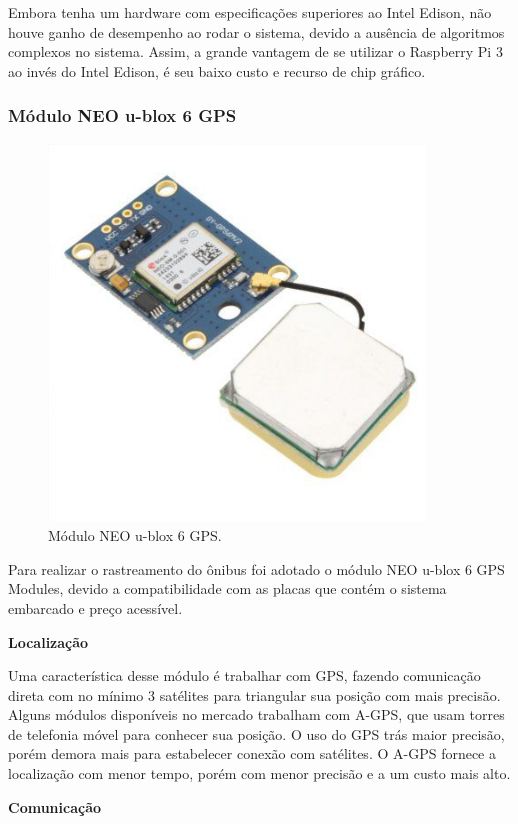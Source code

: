 \documentclass[
	12pt,				%
	oneside,			%
	a4paper,			%
	brazil				%
]{abntex2}
\begin{document}
Embora tenha um hardware com especificações superiores ao Intel Edison, não houve ganho de desempenho ao rodar o sistema, devido a ausência de algoritmos complexos no sistema. Assim, a grande vantagem de se utilizar o Raspberry Pi 3 ao invés do Intel Edison, é seu baixo custo e recurso de chip gráfico.

\subsubsection{Módulo NEO u-blox 6 GPS}

\begin{figure}[!h]
\centering
\includegraphics[width=10cm, center]{images/neo-6m}
\caption{Módulo NEO u-blox 6 GPS.}
\label{Rotulo}
\end{figure}

Para realizar o rastreamento do ônibus foi adotado o módulo NEO u-blox 6 GPS Modules, devido a compatibilidade com as placas que contém o sistema embarcado e preço acessível. 

\textbf{Localização}

Uma característica desse módulo é trabalhar com GPS, fazendo comunicação direta com no mínimo 3 satélites para triangular sua posição com mais precisão. Alguns módulos disponíveis no mercado trabalham com A-GPS, que usam torres de telefonia móvel para conhecer sua posição.
O uso do GPS trás maior precisão, porém demora mais para estabelecer conexão com satélites. O A-GPS fornece a localização com menor tempo, porém com menor precisão e a um custo mais alto.

\textbf{Comunicação}
\end{document}
